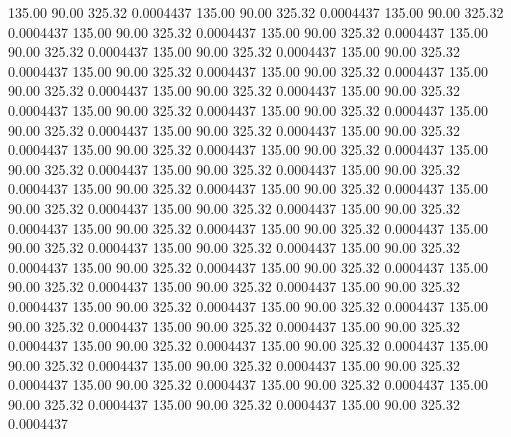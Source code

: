  135.00   90.00  325.32   0.0004437
 135.00   90.00  325.32   0.0004437
 135.00   90.00  325.32   0.0004437
 135.00   90.00  325.32   0.0004437
 135.00   90.00  325.32   0.0004437
 135.00   90.00  325.32   0.0004437
 135.00   90.00  325.32   0.0004437
 135.00   90.00  325.32   0.0004437
 135.00   90.00  325.32   0.0004437
 135.00   90.00  325.32   0.0004437
 135.00   90.00  325.32   0.0004437
 135.00   90.00  325.32   0.0004437
 135.00   90.00  325.32   0.0004437
 135.00   90.00  325.32   0.0004437
 135.00   90.00  325.32   0.0004437
 135.00   90.00  325.32   0.0004437
 135.00   90.00  325.32   0.0004437
 135.00   90.00  325.32   0.0004437
 135.00   90.00  325.32   0.0004437
 135.00   90.00  325.32   0.0004437
 135.00   90.00  325.32   0.0004437
 135.00   90.00  325.32   0.0004437
 135.00   90.00  325.32   0.0004437
 135.00   90.00  325.32   0.0004437
 135.00   90.00  325.32   0.0004437
 135.00   90.00  325.32   0.0004437
 135.00   90.00  325.32   0.0004437
 135.00   90.00  325.32   0.0004437
 135.00   90.00  325.32   0.0004437
 135.00   90.00  325.32   0.0004437
 135.00   90.00  325.32   0.0004437
 135.00   90.00  325.32   0.0004437
 135.00   90.00  325.32   0.0004437
 135.00   90.00  325.32   0.0004437
 135.00   90.00  325.32   0.0004437
 135.00   90.00  325.32   0.0004437
 135.00   90.00  325.32   0.0004437
 135.00   90.00  325.32   0.0004437
 135.00   90.00  325.32   0.0004437
 135.00   90.00  325.32   0.0004437
 135.00   90.00  325.32   0.0004437
 135.00   90.00  325.32   0.0004437
 135.00   90.00  325.32   0.0004437
 135.00   90.00  325.32   0.0004437
 135.00   90.00  325.32   0.0004437
 135.00   90.00  325.32   0.0004437
 135.00   90.00  325.32   0.0004437
 135.00   90.00  325.32   0.0004437
 135.00   90.00  325.32   0.0004437
 135.00   90.00  325.32   0.0004437
 135.00   90.00  325.32   0.0004437
 135.00   90.00  325.32   0.0004437
 135.00   90.00  325.32   0.0004437
